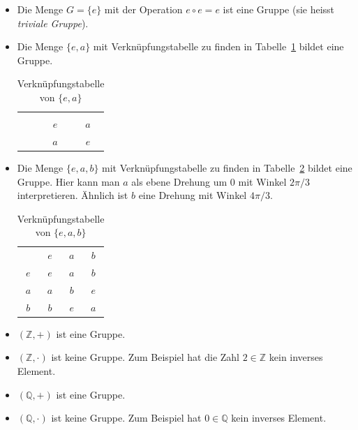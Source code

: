 \documentclass[../main.tex]{subfiles}
\begin{document}
\begin{examples}
  \leavevmode
  \begin{itemize}
    \item Die Menge $G = \{e\}$ mit der Operation
      $e \circ e = e$ ist eine Gruppe (sie heisst \emph{triviale Gruppe}).
    \item Die Menge $\{e, a\}$ mit Verknüpfungstabelle zu finden
      in Tabelle~\ref{tab:ea} bildet eine Gruppe.
      \begin{table}[htb]
        \centering
        \begin{tabular}[h]{ccc}
         & \color{gray}{$e$} & \color{gray}{$a$}\\
        \color{gray}{$e$} & $e$ & $a$ \\
        \color{gray}{$a$} & $a$ & $e$
        \end{tabular}
        \caption{Verknüpfungstabelle von $\{e, a\}$}%
        \label{tab:ea}
      \end{table}

    \item Die Menge $\{e, a, b\}$ mit Verknüpfungstabelle zu finden
      in Tabelle~\ref{tab:eab} bildet eine Gruppe.
      Hier kann man $a$ als ebene Drehung um $0$ mit Winkel $2\pi/3$
      interpretieren. Ähnlich ist $b$ eine Drehung mit
      Winkel $4\pi/3$.
      \begin{table}[htb]
        \centering
        \begin{tabular}[h]{cccc}
        & \color{gray}$e$ & \color{gray}$a$ & \color{gray}$b$\\
        \color{gray}$e$ & $e$ & $a$ & $b$\\
        \color{gray}$a$ & $a$ & $b$ & $e$ \\
        \color{gray}$b$ & $b$ & $e$ & $a$
        \end{tabular}
        \caption{Verknüpfungstabelle von $\{e, a, b\}$}%
        \label{tab:eab}
      \end{table}
      \item $(\mathbb Z, +)$ ist eine Gruppe.
      \item $(\mathbb Z, \cdot)$ ist keine Gruppe. Zum Beispiel hat die Zahl
      $2 \in \mathbb Z$ kein inverses Element.
      \item $(\mathbb Q, +)$ ist eine Gruppe.
      \item $(\mathbb Q, \cdot)$ ist keine Gruppe. Zum Beispiel hat $0 \in \mathbb Q$
      kein inverses Element.
  \end{itemize}
\end{examples}
\end{document}
